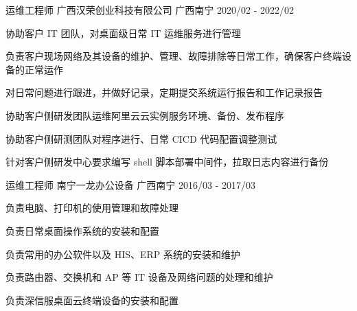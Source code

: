 \begin{cventries}
  \cventry
    {运维工程师} %
    {广西汉荣创业科技有限公司} %
    {广西南宁} %
    {2020/02 - 2022/02} %
    {
      \begin{cvitems} %
        \item {协助客户 IT 团队，对桌面级日常 IT 运维服务进行管理}
        \item {负责客户现场网络及其设备的维护、管理、故障排除等日常工作，确保客户终端设备的正常运作}
        \item {对日常问题进行跟进，并做好记录，定期提交系统运行报告和工作记录报告}
        \item {协助客户侧研发团队运维阿里云云实例服务环境、备份、发布程序}
        \item {协助客户侧研测团队对程序进行、日常 CICD 代码配置调整测试}
        \item {针对客户侧研发中心要求编写 shell 脚本部署中间件，拉取日志内容进行备份}
      \end{cvitems}
    }

  \cventry
    {运维工程师} %
    {南宁一龙办公设备} %
    {广西南宁} %
    {2016/03 - 2017/03} %
    {
      \begin{cvitems} %
        \item {负责电脑、打印机的使用管理和故障处理}
        \item {负责日常桌面操作系统的安装和配置}
        \item {负责常用的办公软件以及 HIS、ERP 系统的安装和维护}
        \item {负责路由器、交换机和 AP 等 IT 设备及网络问题的处理和维护}
        \item {负责深信服桌面云终端设备的安装和配置}
      \end{cvitems}
    }

\end{cventries}
